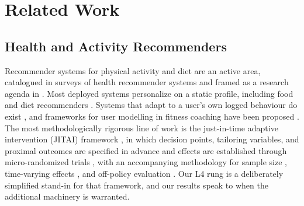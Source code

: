 \documentclass[conference]{IEEEtran}
\begin{document}
\section{Related Work}

\subsection{Health and Activity Recommenders}
Recommender systems for physical activity and diet are an active area, catalogued in surveys of health recommender systems \cite{decroon2021hrs, tran2021healthcare} and framed as a research agenda in \cite{schafer2017health}. Most deployed systems personalize on a static profile, including food and diet recommenders \cite{min2020food, elsweiler2022foodrs}. Systems that adapt to a user's own logged behaviour do exist \cite{rabbi2015mybehavior}, and frameworks for user modelling in fitness coaching have been proposed \cite{herrmanny2021umap}. The most methodologically rigorous line of work is the just-in-time adaptive intervention (JITAI) framework \cite{nahumshani2018jitai}, in which decision points, tailoring variables, and proximal outcomes are specified in advance and effects are established through micro-randomized trials \cite{klasnja2015mrt, klasnja2019heartsteps}, with an accompanying methodology for sample size \cite{liao2016samplesize}, time-varying effects \cite{boruvka2018tveffect, qian2021excursion}, and off-policy evaluation \cite{liao2021offpolicy, liao2020personalized}. Our L4 rung is a deliberately simplified stand-in for that framework, and our results speak to when the additional machinery is warranted.
\end{document}

